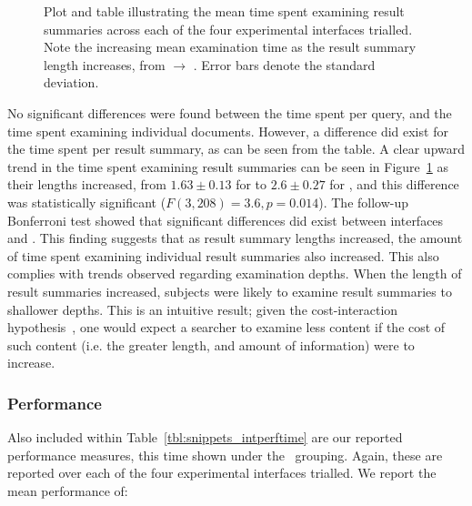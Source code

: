 \begin{figure}[t!]
    \centering
    \caption[Time per result summary]{Plot and table illustrating the mean time spent examining result summaries across each of the four experimental interfaces trialled. Note the increasing mean examination time as the result summary length increases, from  $\rightarrow$ . Error bars denote the standard deviation.}
    \label{fig:time_snippet}
\end{figure}

No significant differences were found between the time spent per query, and the time spent examining individual documents. However, a difference did exist for the time spent per result summary, as can be seen from the table. A clear upward trend in the time spent examining result summaries can be seen in Figure~\ref{fig:time_snippet} as their lengths increased, from $1.63\pm0.13$ for  to $2.6\pm0.27$ for , and this difference was statistically significant ($F(3,208) = 3.6, p=0.014$). The follow-up Bonferroni test showed that significant differences did exist between interfaces  and . This finding suggests that as result summary lengths increased, the amount of time spent examining individual result summaries also increased. This also complies with trends observed regarding examination depths. When the length of result summaries increased, subjects were likely to examine result summaries to shallower depths. This is an intuitive result; given the cost-interaction hypothesis~\citep{azzopardi2011economics}, one would expect a searcher to examine less content if the cost of such content (i.e. the greater length, and amount of information) were to increase.

\subsubsection{Performance}
Also included within Table~\ref{tbl:snippets_intperftime} are our reported performance measures, this time shown under the ~grouping. Again, these are reported over each of the four experimental interfaces trialled. We report the mean performance of:

